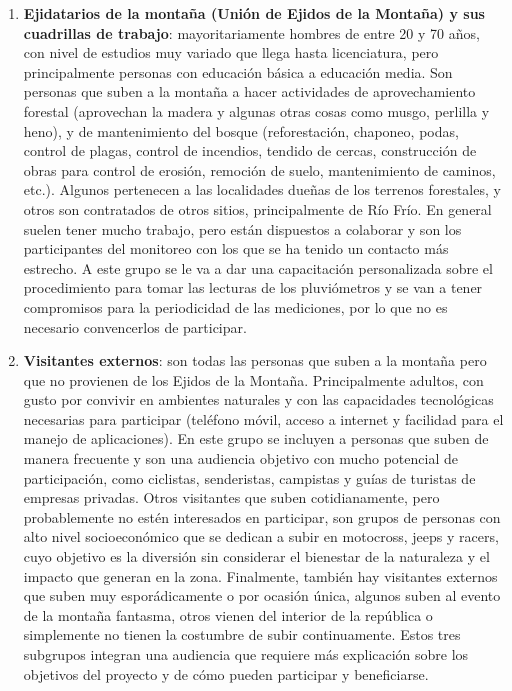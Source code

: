 \begin{enumerate}
    \item \textbf{Ejidatarios de la montaña (Unión de Ejidos de la Montaña) y sus cuadrillas de trabajo}: mayoritariamente hombres de entre 20 y 70 años, con nivel de estudios muy variado que llega hasta licenciatura, pero principalmente personas con educación básica a educación media. Son personas que suben a la montaña a hacer actividades de aprovechamiento forestal (aprovechan la madera y algunas otras cosas como musgo, perlilla y heno), y de mantenimiento del bosque (reforestación, chaponeo, podas, control de plagas, control de incendios, tendido de cercas, construcción de obras para control de erosión, remoción de suelo, mantenimiento de caminos, etc.). Algunos pertenecen a las localidades dueñas de los terrenos forestales, y otros son contratados de otros sitios, principalmente de Río Frío. En general suelen tener mucho trabajo, pero están dispuestos a colaborar y son los participantes del monitoreo con los que se ha tenido un contacto más estrecho. A este grupo se le va a dar una capacitación personalizada sobre el procedimiento para tomar las lecturas de los pluviómetros y se van a tener compromisos para la periodicidad de las mediciones, por lo que no es necesario convencerlos de participar.
    \item \textbf{Visitantes externos}: son todas las personas que suben a la montaña pero que no provienen de los Ejidos de la Montaña. Principalmente adultos, con gusto por convivir en ambientes naturales y con las capacidades tecnológicas necesarias para participar (teléfono móvil, acceso a internet y facilidad para el manejo de aplicaciones). En este grupo se incluyen a personas que suben de manera frecuente y son una audiencia objetivo con mucho potencial de participación, como ciclistas, senderistas, campistas y guías de turistas de empresas privadas. Otros visitantes que suben cotidianamente, pero probablemente no estén interesados en participar, son grupos de personas con alto nivel socioeconómico que se dedican a subir en motocross, jeeps y racers, cuyo objetivo es la diversión sin considerar el bienestar de la naturaleza y el impacto que generan en la zona. Finalmente, también hay visitantes externos que suben muy esporádicamente o por ocasión única, algunos suben al evento de la montaña fantasma, otros vienen del interior de la república o simplemente no tienen la costumbre de subir continuamente. Estos tres subgrupos integran una audiencia que requiere más explicación sobre los objetivos del proyecto y de cómo pueden participar y beneficiarse.

\end{enumerate}
